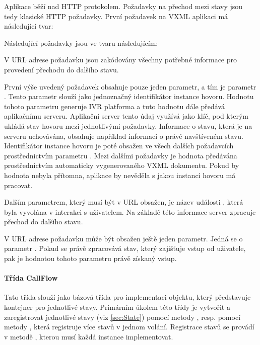 \documentclass[ing,male,java,dept460]{diploma}						%
\begin{document}
Aplikace běží nad HTTP protokolem. Požadavky na přechod mezi stavy jsou tedy klasické HTTP požadavky. První požadavek na VXML aplikaci má následující tvar:


Následující požadavky jsou ve tvaru následujícím:


V URL adrese požadavku jsou zakódovány všechny potřebné informace pro provedení přechodu do dalšího stavu.

První výše uvedený požadavek obsahuje pouze jeden parametr, a tím je parametr . Tento parametr slouží jako jednoznačný identifikátor instance hovoru. Hodnotu tohoto parametru generuje IVR platforma a tuto hodnotu dále předává aplikačnímu serveru. Aplikační server tento údaj využívá jako klíč, pod kterým ukládá stav hovoru mezi jednotlivými požadavky. Informace o stavu, která je na serveru uchovávána, obsahuje například informaci o právě navštíveném stavu. Identifikátor instance hovoru je poté obsažen ve všech dalších požadavcích prostřednictvím parametru . Mezi dalšími požadavky je hodnota předávána prostřednictvím automaticky vygenerovaného VXML dokumentu. Pokud by hodnota nebyla přítomna, aplikace by nevěděla s jakou instancí hovoru má pracovat.

Dalším parametrem, který musí být v URL obsažen, je název události , která byla vyvolána v interakci s uživatelem. Na základě této informace server zpracuje přechod do dalšího stavu.

V URL adrese požadavku může být obsažen ještě jeden parametr. Jedná se o parametr . Pokud se právě zpracovává stav, který zajišťuje vstup od uživatele, pak je hodnotou tohoto parametru právě získaný vstup.

\paragraph{Třída CallFlow}
\label{sec:CallFlow}
Tato třída slouží jako bázová třída pro implementaci objektu, který představuje kontejner pro jednotlivé stavy. Primárním úkolem této třídy je vytvořit a zaregistrovat jednotlivé stavy (viz \ref{sec:State}) pomocí metody , resp. pomocí metody , která registruje více stavů v jednom volání. Registrace stavů se provádí v metodě , kterou musí každá instance implementovat.
\end{document}

